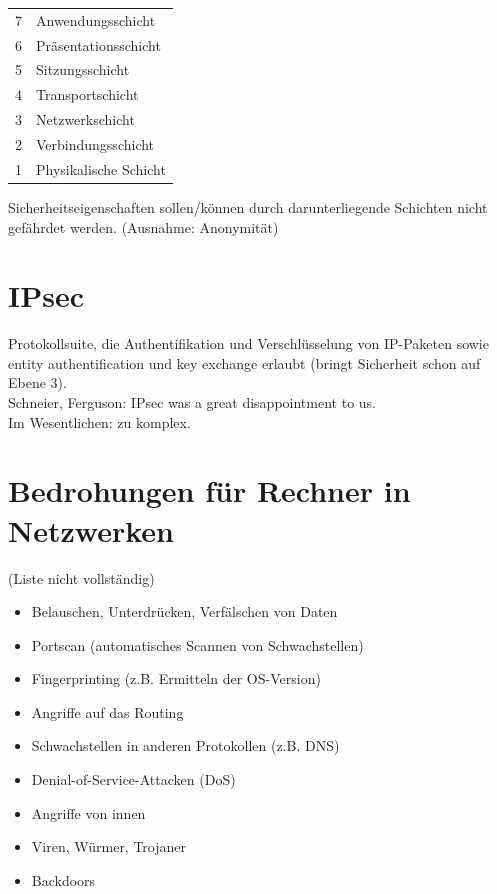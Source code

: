 \documentclass[a4paper,twoside,DIV15,BCOR12mm]{scrbook}
\begin{document}
\begin{tabular}{ll}
7 & Anwendungsschicht\\
6 & Präsentationsschicht\\
5 & Sitzungsschicht\\
4 & Transportschicht\\
3 & Netzwerkschicht\\
2 & Verbindungsschicht\\
1 & Physikalische Schicht
\end{tabular}

Sicherheitseigenschaften sollen/können durch darunterliegende Schichten nicht gefährdet werden. (Ausnahme: Anonymität)

\section{IPsec}

Protokollsuite, die Authentifikation und Verschlüsselung von IP-Paketen sowie entity authentification und key exchange erlaubt (bringt Sicherheit schon auf Ebene 3).\\

Schneier, Ferguson: \glqq IPsec was a great disappointment to us.\grqq\\

Im Wesentlichen: zu komplex.

\section{Bedrohungen für Rechner in Netzwerken}

(Liste nicht vollständig)

\begin{itemize}
	\item Belauschen, Unterdrücken, Verfälschen von Daten
	\item Portscan (automatisches Scannen von Schwachstellen)
	\item Fingerprinting (z.B. Ermitteln der OS-Version)
	\item Angriffe auf das Routing
	\item Schwachstellen in anderen Protokollen (z.B. DNS)
	\item Denial-of-Service-Attacken (DoS)
	\item Angriffe von innen
	\item Viren, Würmer, Trojaner
	\item Backdoors
\end{itemize}
\end{document}
